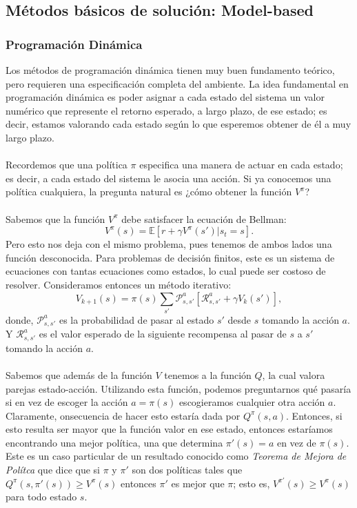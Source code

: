\documentclass[11pt]{article}
\theoremstyle{plain}
\begin{document}
\subsection{Métodos básicos de solución: Model-based}
\subsubsection{Programación Dinámica}
Los métodos de programación dinámica tienen muy buen fundamento teórico, pero requieren una especificación completa del ambiente. La idea fundamental en programación dinámica es poder asignar a cada estado del sistema un valor numérico que represente el retorno esperado, a largo plazo, de ese estado; es decir, estamos valorando cada estado según lo que esperemos obtener de él a muy largo plazo. \\
\\
Recordemos que una política $\pi$ especifica una manera de actuar en cada estado; es decir, a cada estado del sistema le asocia una acción. Si ya conocemos una política cualquiera, la pregunta natural es ¿cómo obtener la función $V^\pi$?\\
\\
Sabemos que la función $V^\pi$ debe satisfacer la ecuación de Bellman:
\[ V^\pi (s) = \mathbb{E}[r + \gamma V^\pi (s') | s_t = s]. \]
Pero esto nos deja con el mismo problema, pues tenemos de ambos lados una función desconocida. Para problemas de decisión finitos, este es un sistema de ecuaciones con tantas ecuaciones como estados, lo cual puede ser costoso de resolver. Consideramos entonces un método iterativo: 
 \[ V_{k+1} (s) = \pi(s) \sum_{s'} \mathcal{P}_{s,s'}^a [ \mathcal{R}_{s,s'}^a + \gamma V_k(s')], \]
donde, $\mathcal{P}_{s,s'}^a$  es la probabilidad de pasar al estado $s'$ desde $s$ tomando la acción $a$. Y $\mathcal{R}_{s,s'}^a$ es el valor esperado de la siguiente recompensa al pasar de $s$ a $s'$ tomando la acción $a$.\\
\\
Sabemos que además de la función $V$ tenemos a la función $Q$, la cual valora parejas estado-acción. Utilizando esta función, podemos preguntarnos qué pasaría si en vez de escoger la acción $a=\pi(s)$ escogieramos cualquier otra acción $a$. Claramente, onsecuencia de hacer esto estaría dada por $Q^{\pi}(s,a)$. Entonces, si esto resulta ser mayor que la función valor en ese estado, entonces estaríamos encontrando una mejor política, una que determina $\pi'(s)=a$ en vez de $\pi(s)$. Este es un caso particular de un resultado conocido como \textit{Teorema de Mejora de Polítca} que dice que si $\pi$ y $\pi'$ son dos políticas tales que $Q^{\pi} (s, \pi'(s)) \geq V^{\pi}(s)$ entonces $\pi'$ es mejor que $\pi$; esto es, $V^{\pi'} (s) \geq V^{\pi}(s)$ para todo estado $s$.\\
\end{document}
